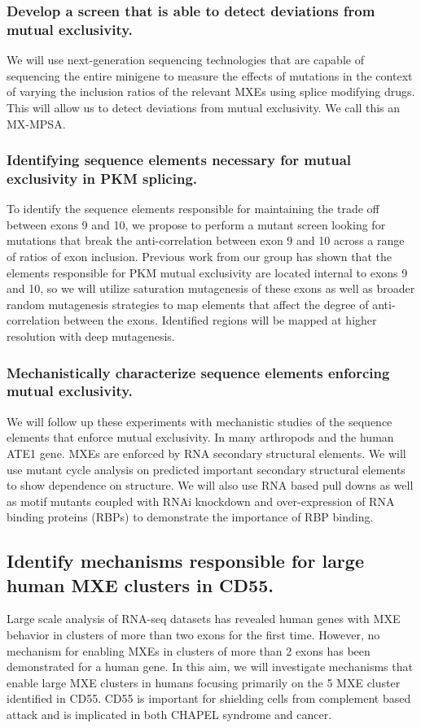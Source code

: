 \documentclass{article}
\begin{document}
\subsubsection{Develop a screen that is able to detect deviations from mutual exclusivity.} We will use next-generation sequencing technologies that are capable of sequencing the entire minigene to measure the effects of mutations in the context of varying the inclusion ratios of the relevant MXEs using splice modifying drugs. This will allow us to detect deviations from mutual exclusivity. We call this an MX-MPSA.
%
\subsubsection{Identifying sequence elements necessary for mutual exclusivity in PKM splicing.} To identify the sequence elements responsible for maintaining the trade off between exons 9 and 10, we propose to perform a mutant screen looking for mutations that break the anti-correlation between exon 9 and 10 across a range of ratios of exon inclusion. Previous work from our group has shown that the elements responsible for PKM mutual exclusivity are located internal to exons 9 and 10, so we will utilize saturation mutagenesis of these exons as well as broader random mutagenesis strategies to map elements that affect the degree of anti-correlation between the exons. Identified regions will be mapped at higher resolution with deep mutagenesis.
%
\subsubsection{Mechanistically characterize sequence elements enforcing mutual exclusivity.} We will follow up these experiments with mechanistic studies of the sequence elements that enforce mutual exclusivity. In many arthropods and the human ATE1 gene.\cite{Graveley2005-oi, Jin2018-tq, Kalinina2021-jt} MXEs are enforced by RNA secondary structural elements. We will use mutant cycle analysis on predicted important secondary structural elements to show dependence on structure. We will also use RNA based pull downs as well as motif mutants coupled with RNAi knockdown and over-expression of RNA binding proteins (RBPs) to demonstrate the importance of RBP binding. 
%
\subsection{Identify mechanisms responsible for large human MXE clusters in CD55.}
Large scale analysis of RNA-seq datasets has revealed human genes with MXE behavior in clusters of more than two exons for the first time.\cite{Hatje2017-oj} However, no mechanism for enabling MXEs in clusters of more than 2 exons has been demonstrated for a human gene. In this aim, we will investigate mechanisms that enable large MXE clusters in humans focusing primarily on the 5 MXE cluster identified in CD55. CD55 is important for shielding cells from complement based attack and is implicated in both CHAPEL syndrome and cancer.\cite{Bharti2022-oz,Stallard2023-ll}
%
\end{document}
